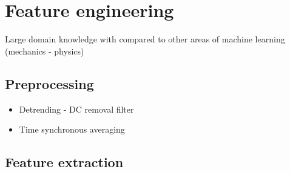 \section{Feature engineering}
Large domain knowledge with compared to other areas of machine learning (mechanics - physics)
\subsection{Preprocessing}
\begin{itemize}
\item Detrending - DC removal filter
\item Time synchronous averaging
\end{itemize}

\subsection{Feature extraction}
\cite{zheng_feature_2018}
\cite{johnson_feature_2019}
\cite{altaf_new_2022}
\cite{mostafavi_novel_2021}
\cite{brito_fault_2021}
\cite{peeters_large_2004}
\cite{zhuo_research_2022}  
\cite{mohammadi_early_2020}
\cite{egaji_data_2020}
\cite{nandi_condition_2019}

\cite{jung_vibration_2017}

